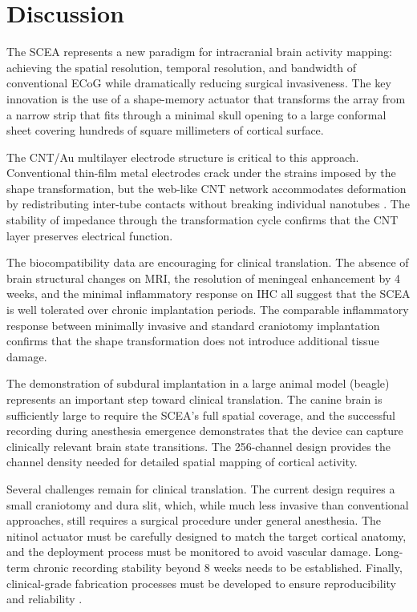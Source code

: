 \documentclass[11pt]{article}
\begin{document}
\section{Discussion}

The SCEA represents a new paradigm for intracranial brain activity mapping: achieving the spatial resolution, temporal resolution, and bandwidth of conventional ECoG while dramatically reducing surgical invasiveness. The key innovation is the use of a shape-memory actuator that transforms the array from a narrow strip that fits through a minimal skull opening to a large conformal sheet covering hundreds of square millimeters of cortical surface.

The CNT/Au multilayer electrode structure is critical to this approach. Conventional thin-film metal electrodes crack under the strains imposed by the shape transformation, but the web-like CNT network accommodates deformation by redistributing inter-tube contacts without breaking individual nanotubes \citep{lipomi2011,khang2006}. The stability of impedance through the transformation cycle confirms that the CNT layer preserves electrical function.

The biocompatibility data are encouraging for clinical translation. The absence of brain structural changes on MRI, the resolution of meningeal enhancement by 4 weeks, and the minimal inflammatory response on IHC all suggest that the SCEA is well tolerated over chronic implantation periods. The comparable inflammatory response between minimally invasive and standard craniotomy implantation confirms that the shape transformation does not introduce additional tissue damage.

The demonstration of subdural implantation in a large animal model (beagle) represents an important step toward clinical translation. The canine brain is sufficiently large to require the SCEA's full spatial coverage, and the successful recording during anesthesia emergence demonstrates that the device can capture clinically relevant brain state transitions. The 256-channel design provides the channel density needed for detailed spatial mapping of cortical activity.

Several challenges remain for clinical translation. The current design requires a small craniotomy and dura slit, which, while much less invasive than conventional approaches, still requires a surgical procedure under general anesthesia. The nitinol actuator must be carefully designed to match the target cortical anatomy, and the deployment process must be monitored to avoid vascular damage. Long-term chronic recording stability beyond 8 weeks needs to be established. Finally, clinical-grade fabrication processes must be developed to ensure reproducibility and reliability \citep{rogers2010}.
\end{document}
